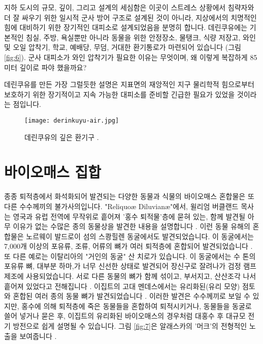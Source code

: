 \documentclass[10pt,twocolumn,letterpaper]{article}
\begin{document}
지하 도시의 규모, 깊이, 그리고 설계의 세심함은 이곳이 스트레스 상황에서 침략자와 더 잘 싸우기 위한 일시적 군사 방어 구조로 설계된 것이 아니라, 지상에서의 치명적인 힘에 대비하기 위한 장기적인 대피소로 설계되었음을 분명히 합니다. 데린쿠유에는 기본적인 침실, 주방, 욕실뿐만 아니라 동물을 위한 안정장소, 물탱크, 식량 저장고, 와인 및 오일 압착기, 학교, 예배당, 무덤, 거대한 환기통로가 마련되어 있습니다 (그림 \ref{fig:6}). 군사 대피소가 와인 압착기가 필요한 이유는 무엇이며, 왜 이렇게 복잡하게 85미터 깊이로 파야 했을까요?

데린쿠유를 만든 가장 그럴듯한 설명은 지표면의 재앙적인 지구 물리학적 힘으로부터 보호하기 위한 장기적이고 지속 가능한 대피소를 준비할 긴급한 필요가 있었을 것이라는 점입니다.

\begin{figure}[t]
\begin{center}
   \texttt{[image: derinkuyu-air.jpg]}
\end{center}
   \caption{데린쿠유의 깊은 환기구 \cite{53}.}
\label{fig:6}
\label{fig:onecol}
\end{figure}

\section{바이오매스 집합}

종종 퇴적층에서 화석화되어 발견되는 다양한 동물과 식물의 바이오매스 혼합물은 또 다른 수수께끼의 불가사의입니다. "Reliquoæ Diluvianæ"에서, 윌리엄 버클랜드 목사는 영국과 유럽 전역에 무작위로 흩어져 '홍수 퇴적물'층에 묻혀 있는, 함께 발견될 아무 이유가 없는 수많은 종의 동물상을 발견한 내용을 설명합니다 \cite{58}. 이런 동물 유해의 혼합물은 노르웨이 발드로이 섬의 스쾅힐렌 동굴에서도 발견되었습니다. 이 동굴에서는 7,000개 이상의 포유류, 조류, 어류의 뼈가 여러 퇴적층에 혼합되어 발견되었습니다 \cite{59}. 또 다른 예로는 이탈리아의 "거인의 동굴" 산 치로가 있습니다. 이 동굴에서는 수 톤의 포유류 뼈, 대부분 하마,가 너무 신선한 상태로 발견되어 장신구로 잘려나가 검정 램프 제조에 사용되었습니다. 서로 다른 동물의 뼈가 함께 섞이고, 부서지고, 산산조각 나서 흩어져 있었다고 전해집니다 \cite{60,61}. 이집트의 고대 멘데스에서는 유리화된(유리 모양) 점토와 혼합된 여러 종의 동물 뼈가 발견되었습니다 \cite{57}. 이러한 발견은 수수께끼로 보일 수 있지만, 홍수에 의해 퇴적층에 죽은 동물들을 혼합하여 퇴적시키거나, 동물들을 동굴로 쓸어 넣거나 묻은 후, 이집트의 유리화된 바이오매스의 경우처럼 대홍수 후 대규모 전기 방전으로 쉽게 설명될 수 있습니다. 그림 \ref{fig:7}은 알래스카의 '머크'의 전형적인 노출을 보여줍니다 \cite{56}.
\end{document}
